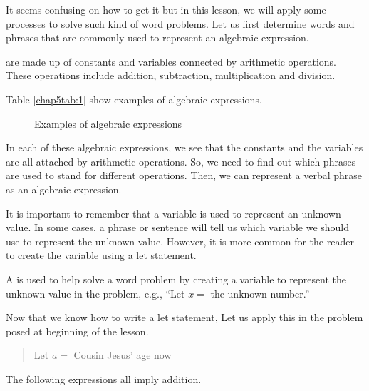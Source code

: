 It seems confusing on how to get it but in this lesson, we will apply some processes to solve such
kind of word problems. Let us first determine words and phrases that are commonly used to
represent an algebraic expression.
\begin{definition}
 are made up of constants and variables connected by arithmetic operations. These operations include addition, subtraction, multiplication and division.
\end{definition}
Table \eqref{chap5tab:1} show examples of algebraic expressions.
\begin{figure}[!h]
\centering
\caption{Examples of algebraic expressions}
\label{chap5tab:2}
\end{figure}
In each of these algebraic expressions, we see that the constants and the variables are all attached
by arithmetic operations. So, we need to find out which phrases are used to stand for different
operations. Then, we can represent a verbal phrase as an algebraic expression.

It is important to remember that a variable is used to represent an unknown value. In some cases, a
phrase or sentence will tell us which variable we should use to represent the unknown value.
However, it is more common for the reader to create the variable using a let statement.
\begin{definition}
A  is used to help solve a word problem by creating a variable to represent the unknown value in the problem, e.g., ``Let $x=$ the unknown number.''
\end{definition}
Now that we know how to write a let statement, Let us apply this in the problem posed at beginning
of the lesson.
\begin{quote}
Let $a =$ Cousin Jesus' age now
\end{quote}
The following expressions all imply addition.

